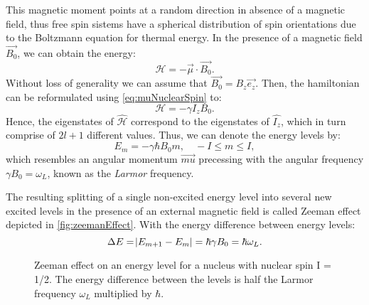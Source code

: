This magnetic moment points at a random direction in absence of a magnetic field, thus free spin sistems have a spherical distribution of spin orientations due to the Boltzmann equation for thermal energy. In the presence of a magnetic field $\vec{B_0}$, we can obtain the energy:
\begin{equation}\label{eq:hamiltonianMu}
\mathcal{H} = -\vec{\mu}\cdot \vec{B_0}.
\end{equation} 
Without loss of generality we can assume that $\vec{B_0} = B_z \vec{e_z}$. Then, the hamiltonian can be reformulated using \autoref{eq:muNuclearSpin} to:
\begin{equation}\label{eq:hamiltonianNuclearSpin}
\mathcal{H} = - \gamma I_z B_0.
\end{equation}
Hence, the eigenstates of $\hat{\mathcal{H}}$ correspond to the eigenstates of $\hat{I_z}$, which in turn comprise of $2l + 1$ different values. Thus, we can denote the energy levels by:
\begin{equation}
E_m = -\gamma\hbar B_0 m,\quad -I\leq m \leq I,
\end{equation}
which resembles an angular momentum $\vec{mu}$ precessing with the angular frequency $\gamma B_0 = \omega_L$, known as the \textit{Larmor} frequency. \cite{Larmor}

The resulting splitting of a single non-excited energy level into several new excited levels in the presence of an external magnetic field is called Zeeman effect depicted in \autoref{fig:zeemanEffect}. With the energy difference between energy levels:
\begin{equation}\label{eq:energyDifference}
\Delta E = \abs{E_{m+1} - E_m} = \hbar \gamma B_0=\hbar \omega_L.
\end{equation}

\begin{figure}[h]

\label{fig:zeemanEffect}
\caption{Zeeman effect on an energy level for a nucleus with nuclear spin I = 1/2. The energy difference between the levels is half the Larmor frequency $\omega_L$ multiplied by $\hbar$.}
\end{figure}


